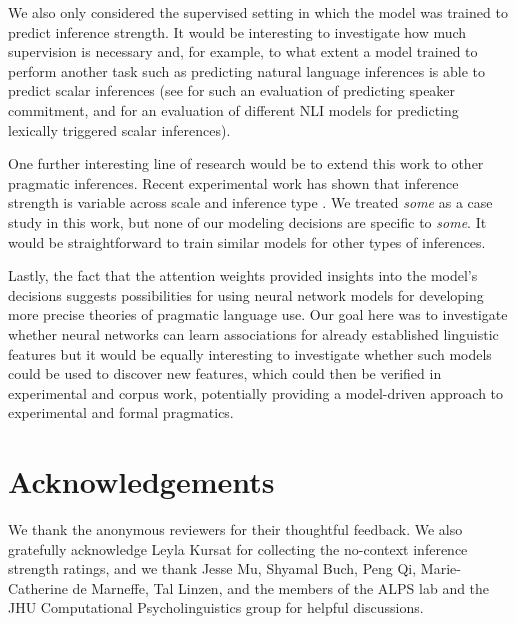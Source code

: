 \documentclass[11pt,a4paper]{article}
\begin{document}
We also only considered the supervised setting in which the model was trained to predict inference strength. It would be interesting to investigate how much supervision is necessary and, for example, to what extent a model trained to perform another task such as predicting natural language inferences is able to predict scalar inferences (see  for such an evaluation of predicting speaker commitment, and  for an evaluation of different NLI models for predicting lexically triggered scalar inferences). 

One further interesting line of research would be to extend this work to other pragmatic inferences. Recent experimental work has shown that inference strength is variable across scale and inference type \citep{doran2012novel, van2016scalar}.  We treated \emph{some} as a case study in this work, but none of our modeling decisions are specific to \emph{some}. It would be straightforward to train similar models for other types of inferences.

Lastly, the fact that the attention weights  provided insights into the model's decisions suggests possibilities for using neural network models for developing more precise theories of pragmatic language use. Our goal here was to investigate whether neural networks can learn associations for already established linguistic features but it would be equally interesting to investigate whether such models could be used to discover new features, which could then be verified in experimental and corpus work, potentially providing a model-driven approach to experimental and formal pragmatics.  


\section*{Acknowledgements}
We thank the anonymous reviewers for their
thoughtful feedback. 
We also gratefully acknowledge Leyla Kursat for collecting the 
no-context inference strength ratings, and we thank Jesse Mu, Shyamal Buch, 
Peng Qi, Marie-Catherine de Marneffe, Tal Linzen, and the members of the 
ALPS lab and the JHU Computational Psycholinguistics group for helpful discussions.

\end{document}
